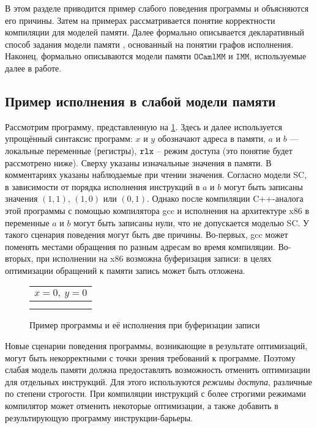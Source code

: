 \documentclass[14pt]{matmex-diploma-custom}
\newcommand{\IMM}{\mathtt{IMM}}
\newcommand{\OMM}{\mathtt{OCaml}\allowbreak \mathtt{MM}}
\newcommand{\defn}[1]{\textit{#1}}
\begin{document}
В этом разделе приводится пример слабого поведения программы и объясняются его причины. Затем на примерах рассматривается понятие корректности компиляции для моделей памяти. Далее формально описывается декларативный способ задания модели памяти \cite{power}, основанный на понятии графов исполнения. Наконец, формально описываются модели памяти $\OMM$ и $\IMM$, используемые далее в работе.

\subsection{Пример исполнения в слабой модели памяти}

Рассмотрим программу, представленную на \cref{fig:store-buffering}. Здесь и далее используется упрощённый синтаксис программ: $x$ и $y$ обозначают адреса в памяти, $a$ и $b$ — локальные переменные (регистры), $\mathtt{rlx}$ – режим доступа (это понятие будет рассмотрено ниже). Сверху указаны изначальные значения в памяти. В комментариях указаны наблюдаемые при чтении значения. Согласно модели SC, в зависимости от порядка исполнения инструкций в $a$ и $b$ могут быть записаны значения $(1, 1)$, $(1, 0)$ или $(0, 1)$. Однако после компиляции C++-аналога этой программы с помощью компилятора gcc и исполнения на архитектуре x86 в переменные $a$ и $b$ могут быть записаны нули, что не допускается моделью SC. У такого сценария поведения могут быть две причины. Во-первых, gcc может поменять местами обращения по разным адресам во время компиляции. Во-вторых, при исполнении на x86 возможна буферизация записи: в целях оптимизации обращений к памяти запись может быть отложена. 

\begin{figure}[h]
  \centering
  \begin{tabular}{L || L}
     \\
    \hline
     &  \\
     &  \\
  \end{tabular}
  \caption{Пример программы и её исполнения при буферизации записи}
  \label{fig:store-buffering}
\end{figure}

Новые сценарии поведения программы, возникающие в результате оптимизаций, могут быть некорректными с точки зрения требований к программе. Поэтому слабая модель памяти должна предоставлять возможность отменить оптимизации для отдельных инструкций. Для этого используются \defn{режимы доступа}, различные по степени строгости.
При компиляции инструкций с более строгими режимами компилятор может отменить некоторые оптимизации, а также добавить в результирующую программу инструкции-барьеры. 
\end{document}
